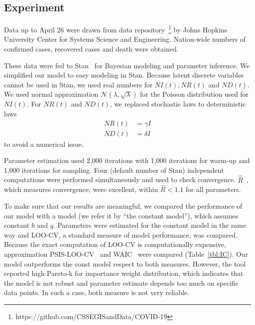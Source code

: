 \documentclass{amsart}
\begin{document}


\subsection{Experiment}

Data up to April 26 were drawn from data repository~\footnote{https://github.com/CSSEGISandData/COVID-19} by Johns Hopkins University Center for Systems Science and Engineering.
Nation-wide numbers of confirmed cases, recovered cases and death were obtained.

These data were fed to Stan~\cite{carpenter2017stan} for Bayesian modeling and parameter inference.
We simplified our model to easy modeling in Stan.
Because latent discrete variables cannot be used in Stan, we used real numbers for $NI(t), NR(t)$ and $ND(t)$.
We used normal approximation $\mathcal{N}(\lambda, \sqrt{\lambda})$ for the Poisson distribution used for $NI(t)$.
For $NR(t)$ and $ND(t)$, we replaced stochastic laws to deterministic laws
\begin{align}
 NR(t) &= \gamma I\\
 ND(t) &= \delta I
\end{align}
to avoid a numerical issue.

Parameter estimation used 2,000 iterations with 1,000 iterations for warm-up and 1,000 iterations for sampling.
Four (default number of Stan) independent computations were performed simultaneously and used to check convergence.
$\hat{R}$~\cite{vehtari2019rank}, which measures convergence, were excellent, within $\hat{R} < 1.1$ for all parameters. 

To make sure that our results are meaningful, we compared the performance of our model with a model (we refer it by ``the constant model''), which assumes constant $b$ and $q$.
Parameters were estimated for the constant model in the same way and LOO-CV, a standard measure of model performance, was compared.
Because the exact computation of LOO-CV is computationally expensive, approximation PSIS-LOO-CV~\cite{Vehtari2017} and WAIC~\cite{watanabe2010asymptotic} were compared (Table~\ref{tbl:IC}).
Our model outperforms the const model respect to both measures.
However, the tool reported high Pareto-k for importance weight distribution, which indicates that the model is not robust and parameter estimate depends too much on specific data points.
In such a case, both measure is not very reliable.
\end{document}
